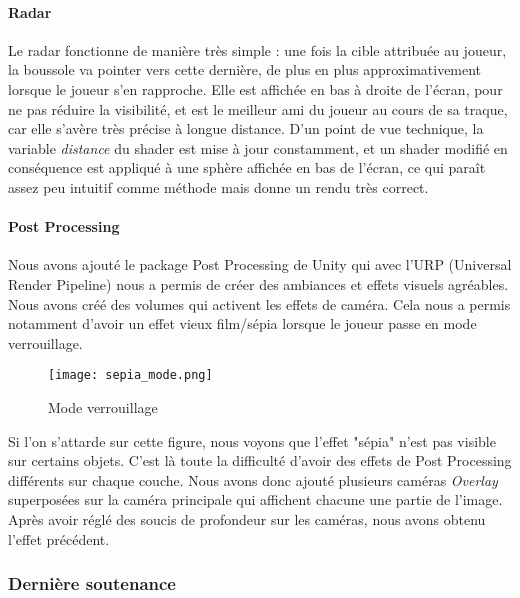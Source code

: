         \paragraph{Radar}

        Le radar fonctionne de manière très simple : une fois la cible attribuée au joueur, la boussole va pointer vers cette dernière, de plus 
        en plus approximativement lorsque le joueur s'en rapproche. Elle est affichée en bas à droite de l'écran, pour ne pas réduire la 
        visibilité, et est le meilleur ami du joueur au cours de sa traque, car elle s'avère très précise à longue distance.
        D'un point de vue technique, la variable \textit{distance} du shader est mise à jour constamment, et un shader modifié en conséquence 
        est appliqué à une sphère affichée en bas de l'écran, ce qui paraît assez peu intuitif comme méthode mais donne un rendu très correct. 
        

        \paragraph{Post Processing}

        Nous avons ajouté le package Post Processing de Unity qui avec l'URP (Universal Render Pipeline)
        nous a permis de créer des ambiances et effets visuels agréables.
        Nous avons créé des volumes qui activent les effets de caméra.
        Cela nous a permis notamment d'avoir un effet vieux film/sépia lorsque le joueur passe en mode verrouillage.

        \begin{figure}[hbt!]
            \centering
            \texttt{[image: sepia\_mode.png]}
            \caption{Mode verrouillage}
        \end{figure}
        \FloatBarrier


        Si l'on s'attarde sur cette figure, nous voyons que l'effet "sépia" n'est pas visible sur certains objets.
        C'est là toute la difficulté d'avoir des effets de Post Processing différents sur chaque couche.
        Nous avons donc ajouté plusieurs caméras \textit{Overlay} superposées sur la caméra principale qui affichent chacune une partie de l'image.
        Après avoir réglé des soucis de profondeur sur les caméras, nous avons obtenu l'effet précédent.

    \subsubsection{Dernière soutenance}

